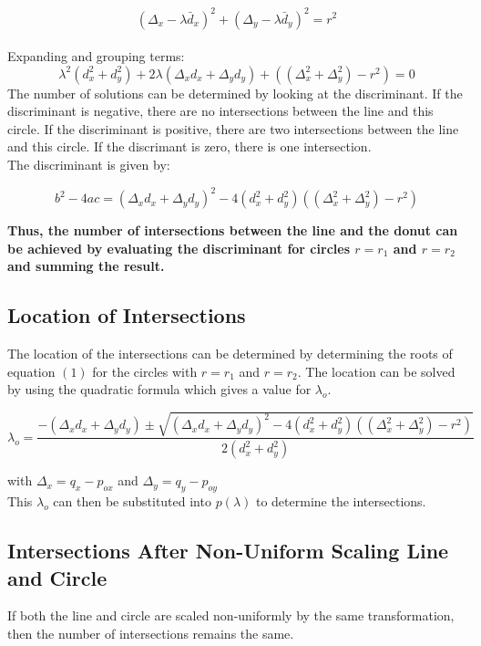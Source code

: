 \documentclass[a4paper,10pt]{scrartcl}
\begin{document}
\[(\Delta_x - \lambda\bar d_x)^2 +  (\Delta_y - \lambda\bar d_y)^2  = r^2\]\\

Expanding and grouping terms:
\begin{equation}
 \lambda^2(d_x^2 + d_y^2) + 2\lambda(\Delta_xd_x + \Delta_yd_y) + ((\Delta_x^2 + \Delta_y^2) - r^2) = 0
\end{equation}
The number of solutions can be determined by looking at the discriminant. If the discriminant is negative, there are no intersections between the line and this circle.
If the discriminant is positive, there are two intersections between the line and this circle. If the discrimant is zero, there is one intersection.\\

The discriminant is given by: 

\[ b^2-4ac = (\Delta_xd_x + \Delta_yd_y)^2 - 4(d_x^2 + d_y^2) ((\Delta_x^2 + \Delta_y^2) - r^2) \]

{\bfseries Thus, the number of intersections between the line and the donut can be achieved by evaluating the discriminant for circles $r = r_1$ and $r = r_2$ and summing the result.}

\subsection{Location of Intersections}

The location of the intersections can be determined by determining the roots of equation $(1)$ for the circles with $r = r_1$ and $r = r_2$. The location can be solved by
using the quadratic formula which gives a value for $\lambda_o$.

\[ \lambda_o = \frac{-(\Delta_xd_x + \Delta_yd_y) \pm \sqrt{(\Delta_xd_x + \Delta_yd_y)^2 - 4(d_x^2 + d_y^2) ((\Delta_x^2 + \Delta_y^2) - r^2)}}{2(d_x^2 + d_y^2)}\]

with $\Delta_x = q_x - p_{ox}$ and $\Delta_y = q_y - p_{oy}$\\

This $\lambda_o$ can then be substituted into $p(\lambda)$ to determine the intersections.


\subsection{Intersections After Non-Uniform Scaling Line and Circle}

If both the line and circle are scaled non-uniformly by the same transformation, then the number of intersections remains the same. \\
\end{document}
